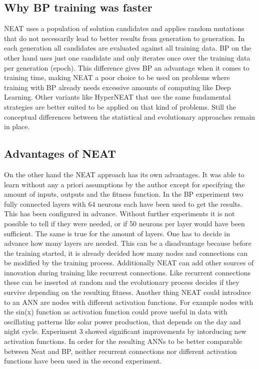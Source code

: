 \documentclass{llncs}
\begin{document}
\subsection{Why BP training was faster}
NEAT uses a population of solution candidates and applies random mutations that do not necessarily lead to better results from generation to generation. In each generation all candidates are evaluated against all training data. BP on the other hand uses just one candidate and only iterates once over the training data per generation (epoch). This difference gives BP an advantage when it comes to training time, making NEAT a poor choice to be used on problems where training with BP already needs excessive amounts of computing like Deep Learning. Other variants like HyperNEAT\cite{.18.05.200921.05.2009} that use the same fundamental strategies are better suited to be applied on that kind of problems. Still the conceptual differences between the statistical and evolutionary approaches remain in place. 
\newline
\subsection{Advantages of NEAT}
On the other hand the NEAT approach has its own advantages. It was able to learn without any a priori assumptions by the author except for specifying the amount of inputs, outputs and the fitness function. In the BP experiment two fully connected layers with 64 neurons each have been used to get the results. This has been configured in advance. Without further experiments it is not possible to tell if they were needed, or if 50 neurons per layer would have been sufficient. The same is true for the amount of layers. One has to decide in advance how many layers are needed. This can be a disadvantage because before the training started, it is already decided how many nodes and connections can be modified by the training process. Additionally NEAT can add other sources of innovation during training like recurrent connections. Like recurrent connections these can be inserted at random and the evolutionary process decides if they survive depending on the resulting fitness. Another thing NEAT could introduce to an ANN are nodes with different activation functions. For example nodes with the sin(x) function as activation function could prove useful in data with oscillating patterns like solar power production, that depends on the day and night cycle. Experiment 3 showed significant improvements by intorducing new activation functions. In order for the resulting ANNs to be better comparable between Neat and BP, neither recurrent connections nor different activation functions have been used in the second experiment. 
\end{document}
